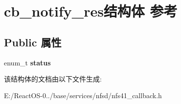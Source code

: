 \hypertarget{structcb__notify__res}{}\section{cb\+\_\+notify\+\_\+res结构体 参考}
\label{structcb__notify__res}
\subsection*{Public 属性}
\begin{DoxyCompactItemize}
\item 
\mbox{\label{structcb__notify__res_a61d3ef19e1bbbeb14b562adf5a458831}} 
enum\+\_\+t {\bfseries status}
\end{DoxyCompactItemize}


该结构体的文档由以下文件生成\+:\begin{DoxyCompactItemize}
\item 
E\+:/\+React\+O\+S-\/0../base/services/nfsd/nfs41\+\_\+callback.\+h\end{DoxyCompactItemize}

